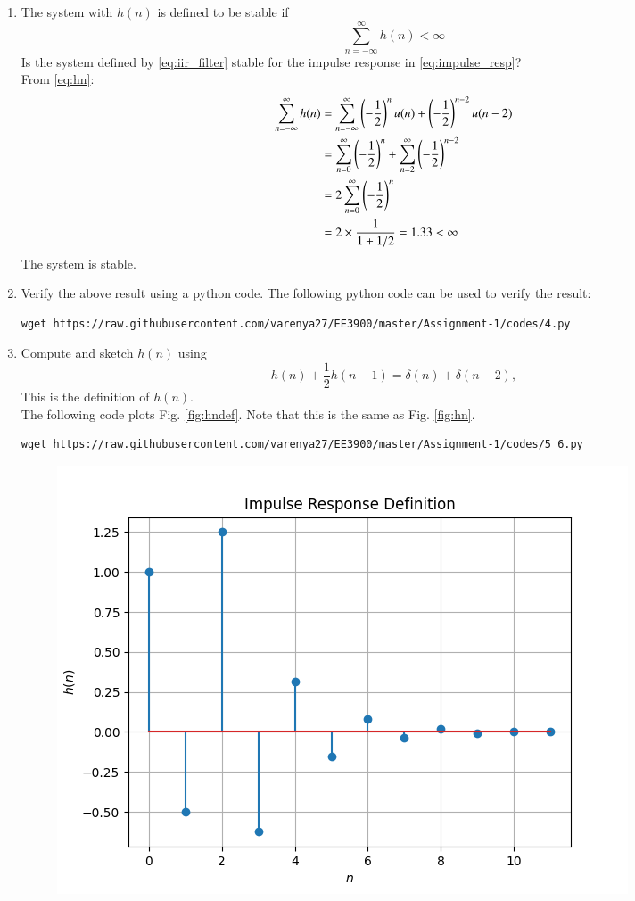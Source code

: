 \documentclass[journal,12pt,twocolumn]{IEEEtran}
\renewcommand\thesection{\arabic{section}}
\begin{document}
\begin{enumerate}[label=\thesection.\arabic*]
%
\item The system with $h(n)$ is defined to be stable if
\begin{equation}
\sum_{n=-\infty}^{\infty}h(n) < \infty
\end{equation}
Is the system defined by \eqref{eq:iir_filter} stable for the impulse response in \eqref{eq:impulse_resp}?
%
\\\solution
From \eqref{eq:hn}:
\begin{align}
    \sum_{n=-\infty}^{\infty} h(n) &= \sum_{n=-\infty}^{\infty}\left(-\frac{1}{2}\right)^{n}u(n) + \left(-\frac{1}{2}\right)^{n-2}u(n-2)\\
    &= \sum_{n=0}^{\infty}\left(-\frac{1}{2}\right)^{n} + \sum_{n=2}^{\infty}\left(-\frac{1}{2}\right)^{n-2}\\
    &= 2\sum_{n=0}^{\infty}\left(-\frac{1}{2}\right)^{n}\\
    &= 2\times\frac{1}{1+1/2}
    = 1.33 < \infty
\end{align}
The system is stable.
\item Verify the above result using a python code.
\solution The following python code can be used to verify the result:
\begin{lstlisting}
wget https://raw.githubusercontent.com/varenya27/EE3900/master/Assignment-1/codes/4.py
\end{lstlisting}
\item 
Compute and sketch $h(n)$ using 
\begin{equation}
\label{eq:iir_filter_h}
h(n) + \frac{1}{2}h(n-1) = \delta(n) + \delta(n-2), 
\end{equation}
%
This is the definition of $h(n)$.
\\
\solution The following code plots Fig. \ref{fig:hndef}. Note that this is the same as Fig. 
\ref{fig:hn}. 
%
\begin{lstlisting}
wget https://raw.githubusercontent.com/varenya27/EE3900/master/Assignment-1/codes/5_6.py
\end{lstlisting}
\begin{figure}[!ht]
\centering
\includegraphics[width=\columnwidth]{figures/Figure_4.png}

\end{figure}
\end{enumerate}
\end{document}
